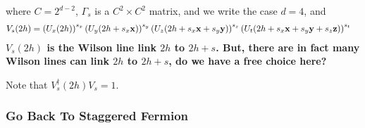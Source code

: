 where $C=2^{d-2}$, $\Gamma _{s}$ is a $C^2 \times C^2$ matrix, and we write the case $d=4$, and
\begin{equation}
\begin{split}
&V_{s}(2h)=\left(U_{x}(2h)\right)^{s_x}\left(U_{y}(2h+s_x{\bf x})\right)^{s_y}\left(U_{z}(2h +s_x{\bf x}+s_y{\bf y})\right)^{s_z}\left(U_{t}(2h+s_x{\bf x}+s_y{\bf y}+s_z{\bf z})\right)^{s_t}
\end{split}
\end{equation}
\textbf{$V_s(2h)$ is the Wilson line link $2h$ to $2h+s$. But, there are in fact many Wilson lines can link $2h$ to $2h+s$, do we have a free choice here?}

Note that $V_s^{\dagger}(2h)V_s=1$.

\subsubsection{\label{QuarkGoBackToStaggered}Go Back To Staggered Fermion}

